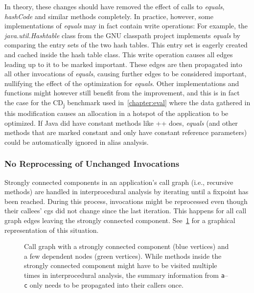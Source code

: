 				In theory, these changes should have removed the effect of calls to \emph{equals}, \emph{hashCode} and similar
				methods completely. In practice, however, some implementations of \emph{equals} may in fact contain write
				operations: For example, the \emph{java.util.Hashtable} class from the GNU classpath project implements
				\emph{equals} by comparing the entry sets of the two hash tables. This entry set is eagerly created and cached
				inside the hash table class. This write operation causes all edges leading up to it to be marked important.
				These edges are then propagated into all other invocations of \emph{equals}, causing further edges to be
				considered important, nullifying the effect of the optimization for \emph{equals}. Other implementations and
				functions might however still benefit from the improvement, and this is in fact the case for the
				CD\textsubscript{j} benchmark used in~\cref{chapter:eval} where the data gathered in this modification causes an
				allocation in a hotspot of the application to be optimized. If Java did have constant methods like \C++{} does,
				\emph{equals} (and other methods that are marked constant and only have constant reference parameters) could be
				automatically ignored in alias analysis.

			\subsubsection{No Reprocessing of Unchanged Invocations}
				\label{subsub:ea:improve:opt:quick-fixpoint}
				Strongly connected components in an application's call graph (i.e., recursive methods) are handled in
				interprocedural analysis by iterating until a fixpoint has been reached. During this process, invocations might
				be reprocessed even though their callees' \glspl{cg} did not change since the last iteration. This happens for
				all call graph edges leaving the strongly connected component. See~\cref{fig:ea:improve:quick-fixpoint} for
				a graphical representation of this situation.

				\begin{figure}
					\centering%

					\caption[Example call graph where avoiding reprocessing saves time]{%
						Call graph with a strongly connected component (blue {\color{cgblue}\blacksquare} vertices) and a few
						dependent nodes (green {\color{cggreen}\blacksquare} vertices). While methods inside the strongly connected
						component might have to be visited multiple times in interprocedural analysis, the summary information from
						\texttt{a}–\texttt{c} only needs to be propagated into their callers once.}%
					\label{fig:ea:improve:quick-fixpoint}%
				\end{figure}

